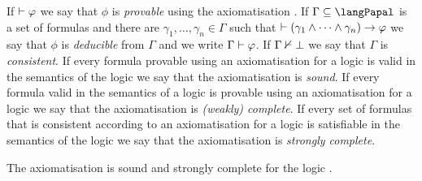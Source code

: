 If $\vdash \varphi$ we say that $\phi$ is {\em provable} using the axiomatisation \axiomPapalS{}.
If $\Gamma \subseteq \langPapal$ is a set of formulas and there are $\gamma_1, \dots, \gamma_n \in \Gamma$ such that $\vdash (\gamma_1 \land \cdots \land \gamma_n) \rightarrow \varphi$ we say that $\phi$ is {\em deducible} from $\Gamma$ and we write $\Gamma \vdash \varphi$.
If $\Gamma \nvdash \bot$ we say that $\Gamma$ is {\em consistent}.
If every formula provable using an axiomatisation for a logic is valid in the semantics of the logic we say that the axiomatisation is {\em sound}.
If every formula valid in the semantics of a logic is provable using an axiomatisation for a logic we say that the axiomatisation is {\em (weakly) complete}.
If every set of formulas that is consistent according to an axiomatisation for a logic is satisfiable in the semantics of the logic we say that the axiomatisation is {\em strongly complete}.

\begin{theorem}
The axiomatisation \axiomPapalS{} is sound and strongly complete for the logic \logicPapalS{}.
\end{theorem}

